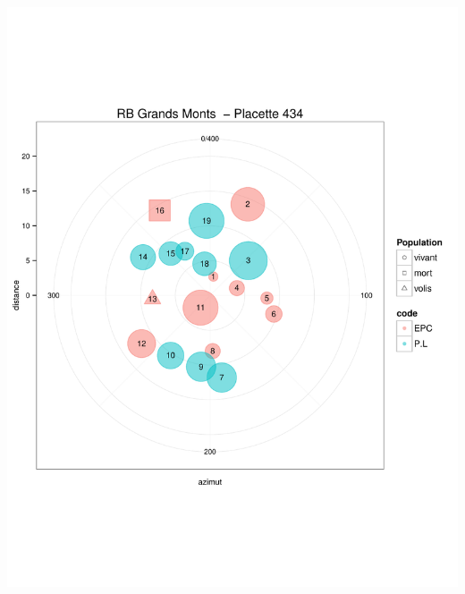 \documentclass[a4paper]{book}\usepackage[]{graphicx}\usepackage[]{color}
\makeatletter
\def\maxwidth{ %
  \ifdim\Gin@nat@width>\linewidth
    \linewidth
  \else
    \Gin@nat@width
  \fi
}
\newenvironment{knitrout}{}{} %
\makeatother
\begin{document}
\begin{knitrout}
{\centering \includegraphics[width=\maxwidth]{Figures/PlanArbres-42} 

}





\end{knitrout}
\end{document}
